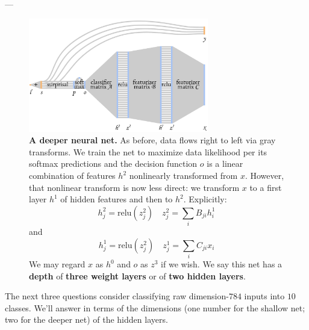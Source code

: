 \documentclass[11pt, justified]{tufte-book}
\newcommand{\samsubsubsection}[1]{
   \vspace{0.1cm}
   \par\noindent{\hspace{-2cm}\normalsize \sc \gre #1} ---
}
\theoremstyle{definition}
\begin{document}
      \samsubsubsection{today: also depth}\vspace{-0.5cm}
        \begin{figure}[h]
          \centering
              \includegraphics[width=0.700\textwidth]{deep}
          \caption{%
            \textbf{A deeper neural net.} As before, data flows right to left
            via {\gre gray} transforms.
            We train the net to maximize data likelihood per its softmax
            predictions and the decision function $o$ is a linear combination
            of features $h^2$ nonlinearly transformed from $x$.
            However, that nonlinear transform is now less direct: we transform
            $x$ to a first layer $h^1$ of hidden features and then to $h^2$.
            Explicitly:\vspace{-0.1cm}
            $$
                h^2_j = \text{relu}(z^2_j) 
                \quad
                z^2_j = \textstyle\sum_{i} B_{ji} h^1_i 
            $$
            and\vspace{-0.1cm}
            $$
                h^1_j = \text{relu}(z^2_j)
                \quad
                z^1_j = \textstyle\sum_{i} C_{ji} x_i 
            $$
            We may regard $x$ as $h^0$ and $o$ as $z^3$ if we wish.
            We say this net has a \textbf{depth} of
            \textbf{three weight layers} or of \textbf{two hidden layers}. 
          }
        \end{figure}

        The next three questions consider classifying
        raw dimension-$784$ inputs into $10$ classes.  We'll answer in terms of
        the dimensions (one number for the shallow net; two for the deeper net)
        of the hidden layers.
\end{document}
